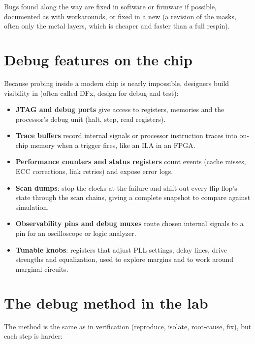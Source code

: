 Bugs found along the way are fixed in software or firmware if possible, documented as  with workarounds, or fixed in a new  (a revision of the masks, often only the metal layers, which is cheaper and faster than a full respin).

\section{Debug features on the chip}

Because probing inside a modern chip is nearly impossible, designers build visibility in (often called DFx, design for debug and test):
\begin{itemize}
  \item \textbf{JTAG and debug ports} give access to registers, memories and the processor's debug unit (halt, step, read registers).
  \item \textbf{Trace buffers} record internal signals or processor instruction traces into on-chip memory when a trigger fires, like an ILA in an FPGA.
  \item \textbf{Performance counters and status registers} count events (cache misses, ECC corrections, link retries) and expose error logs.
  \item \textbf{Scan dumps}: stop the clocks at the failure and shift out every flip-flop's state through the scan chains, giving a complete snapshot to compare against simulation.
  \item \textbf{Observability pins and debug muxes} route chosen internal signals to a pin for an oscilloscope or logic analyzer.
  \item \textbf{Tunable knobs}: registers that adjust PLL settings, delay lines, drive strengths and equalization, used to explore margins and to work around marginal circuits.
\end{itemize}

\section{The debug method in the lab}

The method is the same as in verification (reproduce, isolate, root-cause, fix), but each step is harder:

